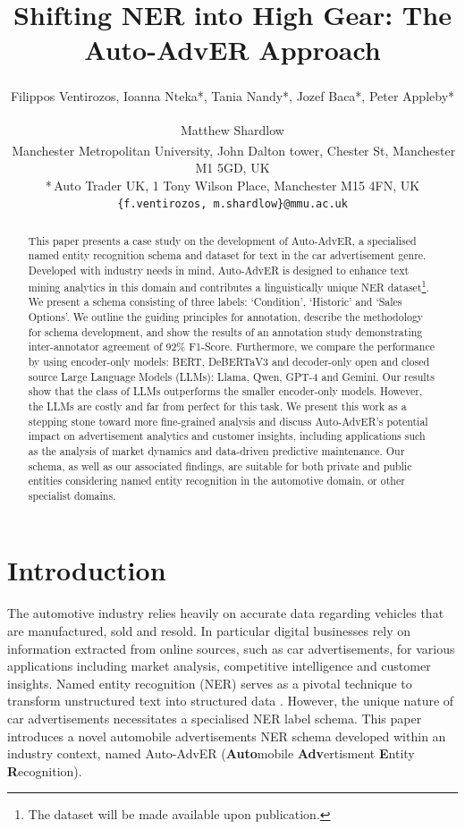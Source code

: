 \documentclass[11pt]{article}
\title{%
    Shifting NER into High Gear: The Auto-AdvER Approach   %
}
\author{
Filippos Ventirozos\textsuperscript{\dag},
Ioanna Nteka*,
Tania Nandy*,
Jozef Baca*,
Peter Appleby* \and
Matthew Shardlow\textsuperscript{\dag} \\
\textsuperscript{\dag}\,Manchester Metropolitan University, John Dalton tower, Chester St, Manchester M1 5GD, UK \\
*\,Auto Trader UK, 1 Tony Wilson Place, Manchester M15 4FN, UK \\
\texttt{\{f.ventirozos, m.shardlow\}@mmu.ac.uk} \\
}
\begin{document}
\maketitle
\begin{abstract}

This paper presents a case study on the development of Auto-AdvER, a specialised named entity recognition schema and dataset for text in the car advertisement genre. Developed with industry needs in mind, Auto-AdvER is designed to enhance text mining analytics in this domain and contributes a linguistically unique NER dataset\footnote{The dataset will be made available upon publication.}. We present a schema consisting of three labels: `Condition', `Historic' and `Sales Options'. We outline the guiding principles for annotation, describe the methodology for schema development, and show the results of an annotation study demonstrating inter-annotator agreement of 92\% F1-Score. Furthermore, we compare the performance by using encoder-only models: BERT, DeBERTaV3 and decoder-only open and closed source Large Language Models (LLMs): Llama, Qwen, GPT-4 and Gemini. 
Our results show that the class of LLMs outperforms the smaller encoder-only models. However, the LLMs are costly and far from perfect for this task.
We present this work as a stepping stone toward more fine-grained analysis and discuss Auto-AdvER's potential impact on advertisement analytics and customer insights, including applications such as the analysis of market dynamics and data-driven predictive maintenance. Our schema, as well as our associated findings, are suitable for both private and public entities considering named entity recognition in the automotive domain, or other specialist domains.

\end{abstract}

\section{Introduction}
The automotive industry relies heavily on accurate data regarding vehicles that are manufactured, sold and resold. In particular digital businesses rely on information extracted from online sources, such as car advertisements, for various applications including market analysis, competitive intelligence and customer insights. Named entity recognition (NER) serves as a pivotal technique to transform unstructured text into structured data \cite{li2020survey}. However, the unique nature of car advertisements necessitates a specialised NER label schema. This paper introduces a novel automobile advertisements NER schema developed within an industry context, named Auto-AdvER (\textbf{Auto}mobile \textbf{Adv}ertisment \textbf{E}ntity \textbf{R}ecognition). 
\end{document}
